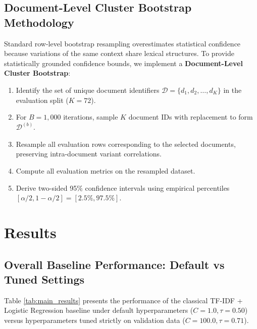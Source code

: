 \documentclass[10pt,conference]{IEEEtran}
\begin{document}
\subsection{Document-Level Cluster Bootstrap Methodology}
Standard row-level bootstrap resampling overestimates statistical confidence because variations of the same context share lexical structures. To provide statistically grounded confidence bounds, we implement a \textbf{Document-Level Cluster Bootstrap}:
\begin{enumerate}
    \item Identify the set of unique document identifiers $\mathcal{D} = \{d_1, d_2, \dots, d_K\}$ in the evaluation split ($K=72$).
    \item For $B=1,000$ iterations, sample $K$ document IDs with replacement to form $\mathcal{D}^{(b)}$.
    \item Resample all evaluation rows corresponding to the selected documents, preserving intra-document variant correlations.
    \item Compute all evaluation metrics on the resampled dataset.
    \item Derive two-sided 95\% confidence intervals using empirical percentiles $[\alpha/2, 1 - \alpha/2] = [2.5\%, 97.5\%]$.
\end{enumerate}

\section{Results}

\subsection{Overall Baseline Performance: Default vs Tuned Settings}
Table \ref{tab:main_results} presents the performance of the classical TF-IDF + Logistic Regression baseline under default hyperparameters ($C=1.0, \tau=0.50$) versus hyperparameters tuned strictly on validation data ($C=100.0, \tau=0.71$).
\end{document}

